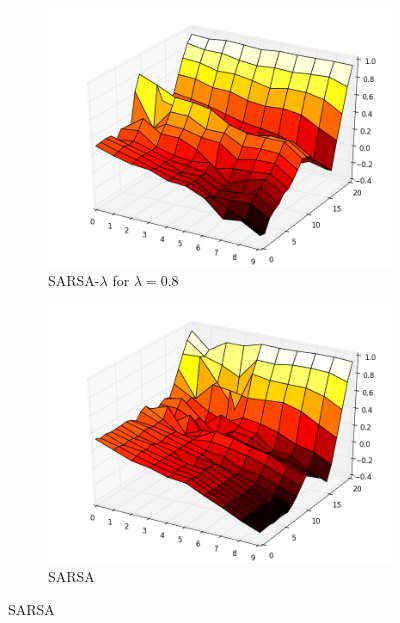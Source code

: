 \documentclass[12pt,a4paper]{article}
\begin{document}
{\begin{figure}
	\begin{subfigure}{.4\textwidth}
		\centering
		\includegraphics[width=.8\linewidth]{Easy21_Results/Sarsa_lambda_0_8_value_1e6.png}
		\caption{\label{E21_SL_V} SARSA-$\lambda$ for $\lambda=0.8$}
	\end{subfigure}%
	\begin{subfigure}{.4\textwidth}
	\centering
	\includegraphics[width=.8\linewidth]{Easy21_Results/Sarsa_value_1e6.png}
	\caption{\label{E21_S_V} SARSA}
	\end{subfigure}%



\end{figure}}
\end{document}
